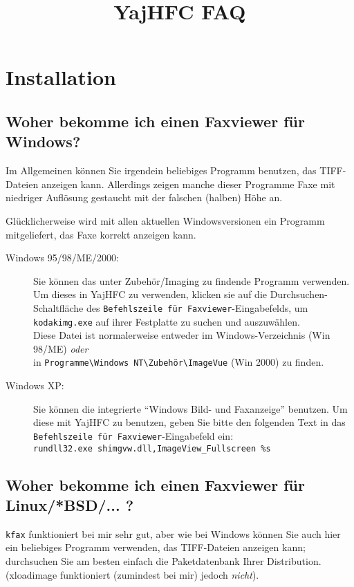 \documentclass[a4paper,10pt,halfparskip,noparindent]{scrartcl}
\title{YajHFC FAQ}
\author{}
\date{}
\begin{document}
\sloppy

\maketitle

\tableofcontents

\section{Installation}
\subsection{Woher bekomme ich einen Faxviewer für Windows?}

Im Allgemeinen können Sie irgendein beliebiges Programm benutzen, das TIFF-Dateien anzeigen kann.
Allerdings zeigen manche dieser Programme Faxe mit niedriger Auflösung gestaucht mit der falschen
(halben) Höhe an.

Glücklicherweise wird mit allen aktuellen Windowsversionen ein Programm mitgeliefert, das Faxe
korrekt anzeigen kann.

\begin{description}
\item[Windows 95/98/ME/2000:]
Sie können das unter Zubehör/Imaging zu findende Programm verwenden.
Um dieses in YajHFC zu verwenden, klicken sie auf die Durchsuchen-Schaltfläche des
\texttt{Befehlszeile für Faxviewer}-Eingabefelds, um \texttt{kodakimg.exe} auf ihrer Festplatte 
zu suchen und auszuwählen.\\
Diese Datei ist normalerweise entweder im Windows-Verzeichnis (Win 98/ME) \emph{oder} \\
in \verb.Programme\Windows NT\Zubehör\ImageVue. (Win 2000) zu finden.
       
\item[Windows XP:]
Sie können die integrierte "`Windows Bild- und Faxanzeige"' benutzen.
Um diese mit YajHFC zu benutzen, geben Sie bitte den folgenden Text in das \texttt{Befehlszeile für Faxviewer}-Eingabefeld ein:\\
\verb#rundll32.exe shimgvw.dll,ImageView_Fullscreen %s#
 \end{description}

      
\subsection{Woher bekomme ich einen Faxviewer für Linux/*BSD/... ?}
\texttt{kfax} funktioniert bei mir sehr gut, aber wie bei Windows können Sie auch
hier ein beliebiges Programm verwenden, das TIFF-Dateien anzeigen kann; durchsuchen
Sie am besten einfach die Paketdatenbank Ihrer Distribution.
(xloadimage funktioniert (zumindest bei mir) jedoch \emph{nicht}).
\end{document}
